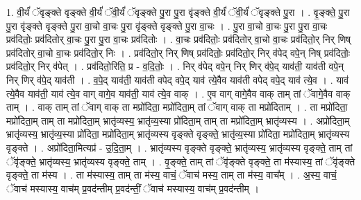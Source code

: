 \documentclass[17pt]{extarticle}
\begin{document}
1. वी॒र्यं॑ ॅवृङ्क्ते वृङ्क्ते वी॒र्यं॑ ॅवी॒र्यं॑ ॅवृङ्क्ते पु॒रा पु॒रा वृ॑ङ्क्ते वी॒र्यं॑ ॅवी॒र्यं॑ ॅवृङ्क्ते पु॒रा । . वृ॒ङ्क्ते॒ पु॒रा पु॒रा वृ॑ङ्क्ते वृङ्क्ते पु॒रा वा॒चो वा॒चः पु॒रा वृ॑ङ्क्ते वृङ्क्ते पु॒रा वा॒चः । . पु॒रा वा॒चो वा॒चः पु॒रा पु॒रा वा॒चः प्रव॑दितोः॒ प्रव॑दितोर् वा॒चः पु॒रा पु॒रा वा॒चः प्रव॑दितोः । . वा॒चः प्रव॑दितोः॒ प्रव॑दितोर् वा॒चो वा॒चः प्रव॑दितो॒र् निर् णिष् प्रव॑दितोर् वा॒चो वा॒चः प्रव॑दितो॒र् निः । . प्रव॑दितो॒र् निर् णिष् प्रव॑दितोः॒ प्रव॑दितो॒र् निर् व॑पेद् वपे॒न् निष् प्रव॑दितोः॒ प्रव॑दितो॒र् निर् व॑पेत् । . प्रव॑दितो॒रिति॒ प्र - व॒दि॒तोः॒ । . निर् व॑पेद् वपे॒न् निर् णिर् व॑पे॒द् याव॑ती॒ याव॑ती वपे॒न् निर् णिर् व॑पे॒द् याव॑ती । . व॒पे॒द् याव॑ती॒ याव॑ती वपेद् वपे॒द् याव॑ त्ये॒वैव याव॑ती वपेद् वपे॒द् याव॑ त्ये॒व । . याव॑ त्ये॒वैव याव॑ती॒ याव॑ त्ये॒व वाग् वागे॒व याव॑ती॒ याव॑ त्ये॒व वाक् । . ए॒व वाग् वागे॒वैव वाक् ताम् तां ॅवागे॒वैव वाक् ताम् । . वाक् ताम् तां ॅवाग् वाक् ता मप्रो॑दिता॒ मप्रो॑दिता॒म् तां ॅवाग् वाक् ता मप्रो॑दिताम् । . ता मप्रो॑दिता॒ मप्रो॑दिता॒म् ताम् ता मप्रो॑दिता॒म् भ्रातृ॑व्यस्य॒ भ्रातृ॑व्य॒स्या प्रो॑दिता॒म् ताम् ता मप्रो॑दिता॒म् भ्रातृ॑व्यस्य । . अप्रो॑दिता॒म् भ्रातृ॑व्यस्य॒ भ्रातृ॑व्य॒स्या प्रो॑दिता॒ मप्रो॑दिता॒म् भ्रातृ॑व्यस्य वृङ्क्ते वृङ्क्ते॒ भ्रातृ॑व्य॒स्या प्रो॑दिता॒ मप्रो॑दिता॒म् भ्रातृ॑व्यस्य वृङ्क्ते । . अप्रो॑दिता॒मित्यप्र॑ - उ॒दि॒ता॒म् । . भ्रातृ॑व्यस्य वृङ्क्ते वृङ्क्ते॒ भ्रातृ॑व्यस्य॒ भ्रातृ॑व्यस्य वृङ्क्ते॒ ताम् तां ॅवृ॑ङ्क्ते॒ भ्रातृ॑व्यस्य॒ भ्रातृ॑व्यस्य वृङ्क्ते॒ ताम् । . वृ॒ङ्क्ते॒ ताम् तां ॅवृ॑ङ्क्ते वृङ्क्ते॒ ता म॑स्यास्य॒ तां ॅवृ॑ङ्क्ते वृङ्क्ते॒ ता म॑स्य । . ता म॑स्यास्य॒ ताम् ता म॑स्य॒ वाचं॒ ॅवाच॑ मस्य॒ ताम् ता म॑स्य॒ वाच᳚म् । . अ॒स्य॒ वाचं॒ ॅवाच॑ मस्यास्य॒ वाच॑म् प्र॒वद॑न्तीम् प्र॒वद॑न्तीं॒ ॅवाच॑ मस्यास्य॒ वाच॑म् प्र॒वद॑न्तीम् । \newline
\end{document}
